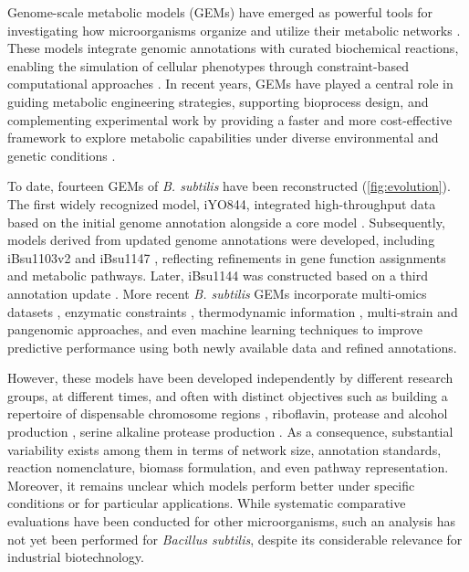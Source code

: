\documentclass[11pt, a4paper]{article}
\begin{document}
\medskip

Genome-scale metabolic models (GEMs) have emerged as powerful tools for investigating how microorganisms organize and utilize their metabolic networks \parencite{gu-2019}. These models integrate genomic annotations with curated biochemical reactions, enabling the simulation of cellular phenotypes through constraint-based computational approaches \parencite{zhang-2016}. In recent years, GEMs have played a central role in guiding metabolic engineering strategies, supporting bioprocess design, and complementing experimental work by providing a faster and more cost-effective framework to explore metabolic capabilities under diverse environmental and genetic conditions \parencite{fang-2020}.

\medskip

To date, fourteen GEMs of \textit{B. subtilis} have been reconstructed (\autoref{fig:evolution}). The first widely recognized model, iYO844, integrated high-throughput data based on the initial genome annotation \parencite{oh-2007} alongside a core model \parencite{goelzer-2008}. Subsequently, models derived from updated genome annotations were developed, including iBsu1103v2 \parencite{tanaka-2012} and iBsu1147 \parencite{hao-2013}, reflecting refinements in gene function assignments and metabolic pathways. Later, iBsu1144 was constructed based on a third annotation update \parencite{kocabas-2017}. More recent \textit{B. subtilis} GEMs incorporate multi-omics datasets \parencite{tibocha-bonilla-2022}, enzymatic constraints \parencite{massaiu-2019}, thermodynamic information \parencite{bi-2023}, multi-strain \parencite{blazquez-2023} and pangenomic \parencite{neal-2024} approaches, and even machine learning \parencite{bi-2024} techniques to improve predictive performance using both newly available data and refined annotations.

\medskip

However, these models have been developed independently by different research groups, at different times, and often with distinct objectives such as building a repertoire of dispensable chromosome regions \parencite{tanaka-2012}, riboflavin, protease and alcohol production \parencite{hao-2013}, serine alkaline protease production \parencite{kocabas-2017}. As a consequence, substantial variability exists among them in terms of network size, annotation standards, reaction nomenclature, biomass formulation, and even pathway representation. Moreover, it remains unclear which models perform better under specific conditions or for particular applications. While systematic comparative evaluations have been conducted for other microorganisms, such an analysis has not yet been performed for \textit{Bacillus subtilis}, despite its considerable relevance for industrial biotechnology.
\end{document}
